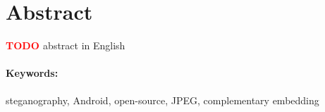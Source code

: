 \documentclass[12pt, oneside]{book}
\def\TODO{\textbf{\textcolor{red}{TODO }}}
\begin{document}
\newpage 
\section*{Abstract}

\TODO abstract in English

\paragraph*{Keywords:} steganography, Android, open-source, JPEG, complementary embedding



\newpage 

\tableofcontents



\newpage 

\listoffigures


\mainmatter

















\newpage	

\backmatter

\thispagestyle{empty}
\nocite{*}
\clearpage

%

 



%
%
%
%
\end{document}
